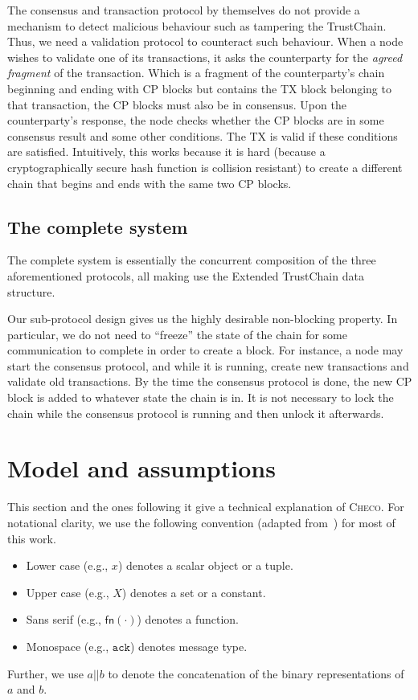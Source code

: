 The consensus and transaction protocol by themselves do not provide a mechanism to detect malicious behaviour such as tampering the TrustChain.
Thus, we need a validation protocol to counteract such behaviour.
When a node wishes to validate one of its transactions, it asks the counterparty for the \emph{agreed fragment} of the transaction.
Which is a fragment of the counterparty's chain beginning and ending with CP blocks but contains the TX block belonging to that transaction,
the CP blocks must also be in consensus.
Upon the counterparty's response,
the node checks whether the CP blocks are in some consensus result and some other conditions.
The TX is valid if these conditions are satisfied.
Intuitively, this works because it is hard (because a cryptographically secure hash function is collision resistant)
to create a different chain that begins and ends with the same two CP blocks.


\subsection*{The complete system}
The complete system is essentially the concurrent composition of the three aforementioned protocols,
all making use the Extended TrustChain data structure.

Our sub-protocol design gives us the highly desirable non-blocking property.
In particular, we do not need to ``freeze'' the state of the chain for some communication to complete in order to create a block.
For instance, a node may start the consensus protocol, and while it is running, create new transactions and validate old transactions.
By the time the consensus protocol is done, the new CP block is added to whatever state the chain is in.
It is not necessary to lock the chain while the consensus protocol is running and then unlock it afterwards.

\section{Model and assumptions}
\label{sec:model-assumptions}

This section and the ones following it give a technical explanation of \textsc{Checo}.
For notational clarity, we use the following convention (adapted from~\cite{miller2016honey}) for most of this work.
\begin{itemize}
\item Lower case (e.g., $x$) denotes a scalar object or a tuple.
\item Upper case (e.g., $X$) denotes a set or a constant.
\item Sans serif (e.g., $\textsf{fn}(\cdot)$) denotes a function.
\item Monospace (e.g., $\texttt{ack}$) denotes message type.
\end{itemize}
Further, we use $a || b$ to denote the concatenation of the binary representations of $a$ and $b$.

